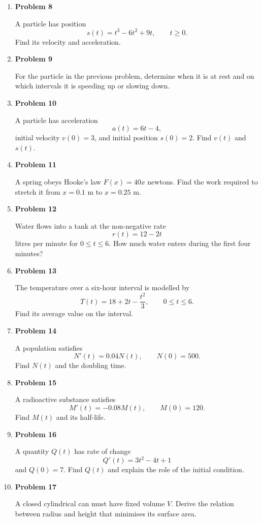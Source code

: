\begin{enumerate}
\item \textbf{Problem 8}\par
A particle has position
\[
s(t)=t^3-6t^2+9t,\qquad t\ge0.
\]
Find its velocity and acceleration.

\item \textbf{Problem 9}\par
For the particle in the previous problem, determine when it is at rest and on which intervals it is speeding up or slowing down.

\item \textbf{Problem 10}\par
A particle has acceleration
\[
a(t)=6t-4,
\]
initial velocity \(v(0)=3\), and initial position \(s(0)=2\). Find \(v(t)\) and \(s(t)\).

\item \textbf{Problem 11}\par
A spring obeys Hooke's law \(F(x)=40x\) newtons. Find the work required to stretch it from \(x=0.1\) m to \(x=0.25\) m.

\item \textbf{Problem 12}\par
Water flows into a tank at the non-negative rate
\[
r(t)=12-2t
\]
litres per minute for \(0\le t\le6\). How much water enters during the first four minutes?

\item \textbf{Problem 13}\par
The temperature over a six-hour interval is modelled by
\[
T(t)=18+2t-\frac{t^2}{3},\qquad 0\le t\le6.
\]
Find its average value on the interval.

\item \textbf{Problem 14}\par
A population satisfies
\[
N'(t)=0.04N(t),
\qquad
N(0)=500.
\]
Find \(N(t)\) and the doubling time.

\item \textbf{Problem 15}\par
A radioactive substance satisfies
\[
M'(t)=-0.08M(t),
\qquad
M(0)=120.
\]
Find \(M(t)\) and its half-life.

\item \textbf{Problem 16}\par
A quantity \(Q(t)\) has rate of change
\[
Q'(t)=3t^2-4t+1
\]
and \(Q(0)=7\). Find \(Q(t)\) and explain the role of the initial condition.

\item \textbf{Problem 17}\par
A closed cylindrical can must have fixed volume \(V\). Derive the relation between radius and height that minimises its surface area.


\end{enumerate}
